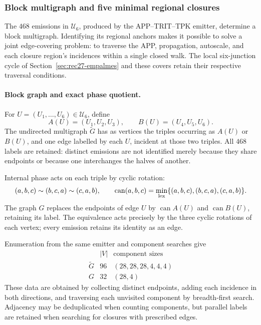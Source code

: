 \subsubsection{Block multigraph and five minimal regional closures}
\label{regcl27:seccion}

The \(468\) emissions in \(\mathcal U_6\), produced by the
APP--TRIT--TPK emitter, determine a block multigraph. Identifying its
regional anchors makes it possible to solve a joint edge-covering
problem: to traverse the APP, propagation, autoscale, and each closure
region's incidences within a single closed walk. The local six-junction
cycle of Section~\ref{sec:rec27-empalmes} and these covers retain their
respective traversal conditions.

\paragraph{Block graph and exact phase quotient.}
For \(U=(U_1,\ldots,U_6)\in\mathcal U_6\), define
\begin{equation}
 A(U)=(U_1,U_2,U_3),\qquad B(U)=(U_4,U_5,U_6).
 \label{regcl27:mitades}
\end{equation}
The undirected multigraph \(\widetilde G\) has as vertices the triples
occurring as \(A(U)\) or \(B(U)\), and one edge labelled by each \(U\),
incident at those two triples. All \(468\) labels are retained:
distinct emissions are not identified merely because they share
endpoints or because one interchanges the halves of another.

Internal phase acts on each triple by cyclic rotation:
\begin{equation}
 (a,b,c)\sim(b,c,a)\sim(c,a,b),\qquad
 \operatorname{can}(a,b,c)
 =\min_{\rm lex}\{(a,b,c),(b,c,a),(c,a,b)\}.
 \label{regcl27:fase}
\end{equation}
The graph \(G\) replaces the endpoints of edge \(U\) by
\(\operatorname{can}A(U)\) and \(\operatorname{can}B(U)\), retaining
its label. The equivalence acts precisely by the three cyclic rotations
of each vertex; every emission retains its identity as an edge.

Enumeration from the same emitter and component searches give
\begin{equation}
\begin{array}{c|r|l}
 & |V|&\text{component sizes}\\ \hline
 \widetilde G&96&(28,28,28,4,4,4)\\
 G&32&(28,4)
\end{array}
\label{regcl27:componentes}
\end{equation}
These data are obtained by collecting distinct endpoints, adding each
incidence in both directions, and traversing each unvisited component
by breadth-first search. Adjacency may be deduplicated when counting
components, but parallel labels are retained when searching for
closures with prescribed edges.

